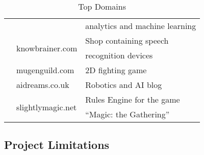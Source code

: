 \begin{table}
{\begin{tabular}{rll}
                                  &                                         & analytics and machine learning \\
        \addlinespace[0.7em]
        \multirow{2}{*}{71\quad}  & \multirow{2}{*}{knowbrainer.com}        & Shop containing speech \\
                                  &                                         & recognition devices\\
        \addlinespace[0.7em]
        {58\quad}                 & mugenguild.com                          & 2D fighting game \\
        \addlinespace[0.7em]
        {52\quad}                 & aidreams.co.uk                          & Robotics and AI blog\\
        \addlinespace[0.7em]
        \multirow{2}{*}{51\quad}  & \multirow{2}{*}{slightlymagic.net}      & Rules Engine for the game \\
                                  &                                         & ``Magic: the Gathering'' \\
        \bottomrule
    \end{tabular}
    }
\caption{\label{Top-Domains}
Top Domains
}
\end{table}
\subsection{Project Limitations}


